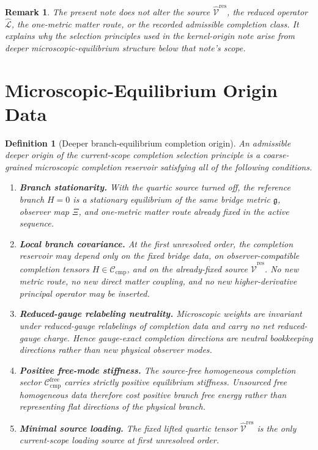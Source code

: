 \documentclass[11pt]{article}
\newcommand{\ObserverMap}{\Xi}
\newcommand{\BridgeMetric}{\mathfrak g}
\newcommand{\ResidualLift}{\widehat{\mathcal V}^{\mathrm{res}}}
\newcommand{\SubReducedEin}{\widehat{\mathcal L}}
\newcommand{\CompClass}{\mathscr C_{\mathrm{cmp}}}
\newcommand{\CompFree}{\mathscr C_{\mathrm{cmp}}^{\mathrm{free}}}
\newtheorem{definition}{Definition}
\newtheorem{remark}{Remark}
\begin{document}
\begin{remark}
The present note does not alter the source \(\ResidualLift\), the reduced operator \(\SubReducedEin\), the one-metric matter route, or the recorded admissible completion class. It explains why the selection principles used in the kernel-origin note arise from deeper microscopic-equilibrium structure below that note's scope.
\end{remark}

\section{Microscopic-Equilibrium Origin Data}

\begin{definition}[Deeper branch-equilibrium completion origin]
\label{def:micro}
An \emph{admissible deeper origin of the current-scope completion selection principle} is a coarse-grained microscopic completion reservoir satisfying all of the following conditions.
\begin{enumerate}
    \item \textbf{Branch stationarity.} With the quartic source turned off, the reference branch \(H=0\) is a stationary equilibrium of the same bridge metric \(\BridgeMetric\), observer map \(\ObserverMap\), and one-metric matter route already fixed in the active sequence.
    \item \textbf{Local branch covariance.} At the first unresolved order, the completion reservoir may depend only on the fixed bridge data, on observer-compatible completion tensors \(H\in\CompClass\), and on the already-fixed source \(\ResidualLift\). No new metric route, no new direct matter coupling, and no new higher-derivative principal operator may be inserted.
    \item \textbf{Reduced-gauge relabeling neutrality.} Microscopic weights are invariant under reduced-gauge relabelings of completion data and carry no net reduced-gauge charge. Hence gauge-exact completion directions are neutral bookkeeping directions rather than new physical observer modes.
    \item \textbf{Positive free-mode stiffness.} The source-free homogeneous completion sector \(\CompFree\) carries strictly positive equilibrium stiffness. Unsourced free homogeneous data therefore cost positive branch free energy rather than representing flat directions of the physical branch.
    \item \textbf{Minimal source loading.} The fixed lifted quartic tensor \(\ResidualLift\) is the only current-scope loading source at first unresolved order.
\end{enumerate}
\end{definition}
\end{document}

